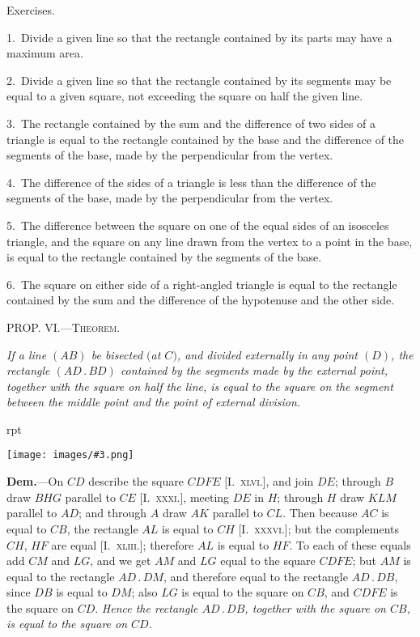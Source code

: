 \documentclass[oneside]{book}
\newcounter{wrapwidth}
\newcommand\mypropl[2]{
\bigskip\Needspace*{4\baselineskip}\begin{center}\textsc{#1}\end{center}
\hspace{\parindent}\emph{#2}\par\medskip
}
\newcommand\exhead[1]{
\Needspace*{5\baselineskip}\begin{center}
\textsf{#1}
\end{center}
}
\newcommand\imgflow[3]{
\setcounter{wrapwidth}{#1}
\begin{wrapfigure}[#2]{r}{\value{wrapwidth}pt}
\begin{center}
\vspace{-0.3in}
\texttt{[image: images/\#3.png]}
\end{center}
\end{wrapfigure}
}
\begin{document}

\exhead{Exercises.}

\begin{footnotesize}
1.~Divide a given line so that the rectangle contained by its
parts may have a maximum area.

2.~Divide a given line so that the rectangle contained by its
segments may be equal to a given square, not exceeding the
square on half the given line.

3.~The rectangle contained by the sum and the difference of
two sides of a triangle is equal to the rectangle contained by the
base and the difference of the segments of the base, made by the
perpendicular from the vertex.

4.~The difference of the sides of a triangle is less than the
difference of the segments of the base, made by the perpendicular
from the vertex.

5.~The difference between the square on one of the equal sides
of an isosceles triangle, and the square on any line drawn from
the vertex to a point in the base, is equal to the rectangle contained
by the segments of the base.

6.~The square on either side of a right-angled triangle is equal
to the rectangle contained by the sum and the difference of the
hypotenuse and the other side.
\par\end{footnotesize}

\mypropl{PROP\@. VI\@.---Theorem.}{If a line $(AB)$ be bisected $($at $C)$, and divided externally
in any point $(D)$, the rectangle $(AD\,.\,BD)$ contained
by the segments made by the external point, together with
the square on half the line, is equal to the square on the
segment between the middle point and the point of external
division.}

\imgflow{150}{9}{f085}

\textbf{Dem.}---On $CD$ describe the square $CDFE$ [I.~\textsc{xlvi}.],
and join $DE$; through $B$
draw $BHG$ parallel to $CE$
[I.~\textsc{xxxi}.], meeting $DE$ in
$H$; through $H$ draw $KLM$
parallel to $AD$; and through
$A$ draw $AK$ parallel to $CL$.
Then because $AC$ is equal to
$CB$, the rectangle $AL$ is equal
to $CH$ [I.~\textsc{xxxvi}.]; but the complements $CH$, $HF$ are
equal [I.~\textsc{xliii}.]; therefore $AL$ is equal to $HF$. To
each of these equals add $CM$ and $LG$, and we get $AM$
and $LG$ equal to the square $CDFE$; but $AM$ is equal to
the rectangle $AD\,.\,DM$, and therefore equal to the
rectangle $AD\,.\,DB$, since $DB$ is equal to $DM$; also $LG$
is equal to the square on $CB$, and $CDFE$ is the square
on $CD$. \textit{Hence the rectangle $AD\,.\,DB$, together with the
square on $CB$, is equal to the square on $CD$.} %
\end{document}
